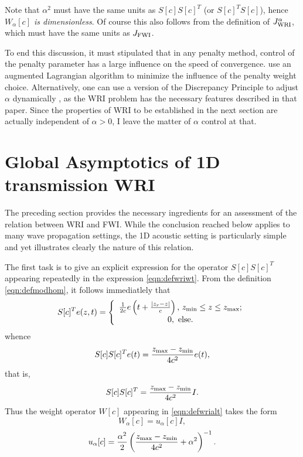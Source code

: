 Note that $\alpha^2$ must have the same units as $S[c]S[c]^T$ (or
$S[c]^TS[c]$), hence {\em $W_{\alpha}[c]$ is dimensionless}. Of course
this also follows from the definition of
$ J_{\rm WRI}^{\alpha}$, which must have the same units as $J_{\rm FWI}$.

To end this discussion, it must stipulated that in any penalty method,
control of the penalty parameter has a large influence on the speed of
convergence. \cite{Aghamiry:19} use an augmented Lagrangian algorithm
to minimize the influence of the penalty weight choice. Alternatively,
one can use a version of the Discrepancy Principle to adjust $\alpha$
dynamically \cite[]{FuSymes2017discrepancy}, as the WRI problem has
the necessary features described in that paper. Since the properties
of WRI to be established in the next section are actually independent
of $\alpha>0$, I leave the matter of $\alpha$ control at that.


\section{Global Asymptotics of 1D transmission WRI}
The preceding section provides the necessary ingredients for an assessment of the relation between WRI and FWI. While the conclusion reached below applies to many wave propagation settings, the 1D acoustic setting is particularly simple and yet illustrates clearly the nature of this relation.

The first task is to give an explicit expression for the operator $S[c]S[c]^T$ appearing repeatedly in the expression \ref{eqn:defwriwt}. From the definition \ref{eqn:defmodhom}, it follows immediatlely that 
\begin{equation}
  \label{eqn:modhomtrans}
S[c]^Te(z,t)=
\left\{
    \begin{array}{c}
      \frac{1}{2c}e\left(t +  \frac{|z_r-z|}{c}\right), \,z_{\rm min} \le z \le z_{\rm max};\\
      0, \mbox{ else.}
    \end{array}
  \right.
\end{equation}
whence
\[
  S[c]S[c]^Te(t) = \frac{z_{\rm max}-z_{\rm min}}{4c^2}e(t),
\]
that is,
\begin{equation}
  \label{eqn:modhomnormal}
  S[c]S[c]^T = \frac{z_{\rm max}-z_{\rm min}}{4c^2}I.
\end{equation}
Thus the weight operator $W[c]$ appearing in \ref{eqn:defwrialt} takes
the form
\[
  W_{\alpha}[c] = u_{\alpha}[c] I,
\]
\begin{equation}
  \label{eqn:wriwthom}
u_{\alpha}[c] = \frac{\alpha^2}{2}\left(\frac{z_{\rm max}-z_{\rm min}}{4c^2}+\alpha^2\right)^{-1}.
\end{equation}

